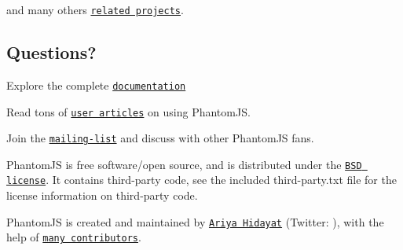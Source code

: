 and many others \href{https://github.com/ariya/phantomjs/wiki/Related-Projects}{\tt related projects}.

\subsection*{Questions?}


\begin{DoxyItemize}
\item Explore the complete \href{https://github.com/ariya/phantomjs/wiki}{\tt documentation}
\item Read tons of \href{https://github.com/ariya/phantomjs/wiki/Buzz}{\tt user articles} on using Phantom\+J\+S.
\item Join the \href{http://groups.google.com/group/phantomjs}{\tt mailing-\/list} and discuss with other Phantom\+J\+S fans.
\end{DoxyItemize}

Phantom\+J\+S is free software/open source, and is distributed under the \href{http://opensource.org/licenses/BSD-3-Clause}{\tt B\+S\+D license}. It contains third-\/party code, see the included {\ttfamily third-\/party.\+txt} file for the license information on third-\/party code.

Phantom\+J\+S is created and maintained by \href{http://ariya.ofilabs.com/about}{\tt Ariya Hidayat} (Twitter\+: \href{http://twitter.com/ariyahidayat}{\tt }), with the help of \href{https://github.com/ariya/phantomjs/contributors}{\tt many contributors}. 
